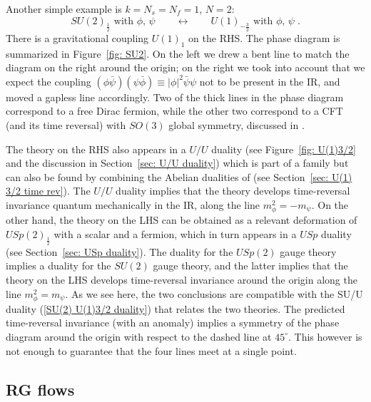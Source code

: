 \documentclass[a4paper, 12pt]{article}
\numberwithin{equation}{section}
\newcommand{\be}{\begin{equation}} \newcommand{\ee}{\end{equation}}
\begin{document}
Another simple example is $k=N_s = N_f = 1$, $N=2$:
\be
\label{SU(2) U(1)3/2 duality}
SU(2)_{\frac12} \text{ with $\phi$, $\psi$} \qquad\longleftrightarrow\qquad U(1)_{-\frac32} \text{ with $\phi$, $\psi$} \;.
\ee
There is a gravitational coupling $U(1)_1$ on the RHS. The phase diagram is summarized in Figure~\ref{fig: SU2}. On the left we drew a bent line to match the diagram on the right around the origin; on the right we took into account that we expect the coupling $(\phi\bar\psi)(\psi\bar\phi) \equiv |\phi|^2\bar\psi\psi$ not to be present in the IR, and moved a gapless line accordingly. Two of the thick lines in the phase diagram correspond to a free Dirac fermion, while the other two correspond to a CFT (and its time reversal) with $SO(3)$ global symmetry, discussed in \cite{Aharony:2016jvv}.

The theory on the RHS also appears in a $U/U$ duality (see Figure~\ref{fig: U(1)3/2} and the discussion in Section~\ref{sec: U/U duality}) which is part of a family but can also be found by combining the Abelian dualities of \cite{Seiberg:2016gmd} (see Section~\ref{sec: U(1) 3/2 time rev}). The $U/U$ duality implies that the theory develops time-reversal invariance quantum mechanically in the IR, along the line $m_\phi^2 = - m_\psi$. On the other hand, the theory on the LHS can be obtained as a relevant deformation of $USp(2)_\frac12$ with a scalar and a fermion, which in turn appears in a $USp$ duality (see Section~\ref{sec: USp duality}). The duality for the $USp(2)$ gauge theory implies a duality for the $SU(2)$ gauge theory, and the latter implies that the theory on the LHS develops time-reversal invariance around the origin along the line $m_\phi^2 = m_\psi$. As we see here, the two conclusions are compatible with the SU/U duality (\ref{SU(2) U(1)3/2 duality}) that relates the two theories. The predicted time-reversal invariance (with an anomaly) implies a symmetry of the phase diagram around the origin with respect to the dashed line at $45^\circ$. This however is not enough to guarantee that the four lines meet at a single point.








\subsection{RG flows}
\label{sec: RG flows}
\end{document}
